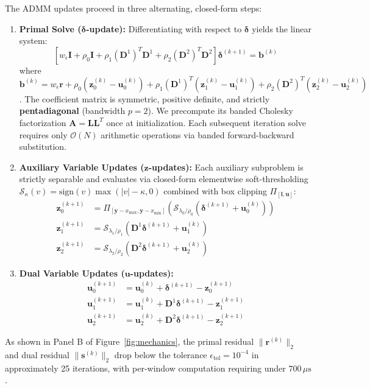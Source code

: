 \documentclass[11pt,a4paper]{article}
\begin{document}
The ADMM updates proceed in three alternating, closed-form steps:
\begin{enumerate}
    \item \textbf{Primal Solve ($\boldsymbol{\delta}$-update):} Differentiating with respect to $\boldsymbol{\delta}$ yields the linear system:
    \begin{equation}
    \left[ w_\epsilon \mathbf{I} + \rho_0 \mathbf{I} + \rho_1 (\mathbf{D}^1)^T \mathbf{D}^1 + \rho_2 (\mathbf{D}^2)^T \mathbf{D}^2 \right] \boldsymbol{\delta}^{(k+1)} = \mathbf{b}^{(k)}
    \end{equation}
    where $\mathbf{b}^{(k)} = w_\epsilon \mathbf{r} + \rho_0(\mathbf{z}_0^{(k)} - \mathbf{u}_0^{(k)}) + \rho_1 (\mathbf{D}^1)^T(\mathbf{z}_1^{(k)} - \mathbf{u}_1^{(k)}) + \rho_2 (\mathbf{D}^2)^T(\mathbf{z}_2^{(k)} - \mathbf{u}_2^{(k)})$.
    The coefficient matrix is symmetric, positive definite, and strictly \textbf{pentadiagonal} (bandwidth $p = 2$). We precompute its banded Cholesky factorization $\mathbf{A} = \mathbf{L} \mathbf{L}^T$ once at initialization. Each subsequent iteration solve requires only $\mathcal{O}(N)$ arithmetic operations via banded forward-backward substitution.
    
    \item \textbf{Auxiliary Variable Updates ($\mathbf{z}$-updates):} Each auxiliary subproblem is strictly separable and evaluates via closed-form elementwise soft-thresholding $\mathcal{S}_\kappa(v) = \text{sign}(v) \max(|v| - \kappa, 0)$ combined with box clipping $\Pi_{[\mathbf{l}, \mathbf{u}]}$:
    \begin{align}
    \mathbf{z}_0^{(k+1)} &= \Pi_{[\mathbf{y} - x_{\max}, \mathbf{y} - x_{\min}]} \left( \mathcal{S}_{\lambda_0 / \rho_0}\left(\boldsymbol{\delta}^{(k+1)} + \mathbf{u}_0^{(k)}\right) \right) \\
    \mathbf{z}_1^{(k+1)} &= \mathcal{S}_{\lambda_1 / \rho_1}\left(\mathbf{D}^1 \boldsymbol{\delta}^{(k+1)} + \mathbf{u}_1^{(k)}\right) \\
    \mathbf{z}_2^{(k+1)} &= \mathcal{S}_{\lambda_2 / \rho_2}\left(\mathbf{D}^2 \boldsymbol{\delta}^{(k+1)} + \mathbf{u}_2^{(k)}\right)
    \end{align}

    \item \textbf{Dual Variable Updates ($\mathbf{u}$-updates):}
    \begin{align}
    \mathbf{u}_0^{(k+1)} &= \mathbf{u}_0^{(k)} + \boldsymbol{\delta}^{(k+1)} - \mathbf{z}_0^{(k+1)} \\
    \mathbf{u}_1^{(k+1)} &= \mathbf{u}_1^{(k)} + \mathbf{D}^1 \boldsymbol{\delta}^{(k+1)} - \mathbf{z}_1^{(k+1)} \\
    \mathbf{u}_2^{(k+1)} &= \mathbf{u}_2^{(k)} + \mathbf{D}^2 \boldsymbol{\delta}^{(k+1)} - \mathbf{z}_2^{(k+1)}
    \end{align}
\end{enumerate}
As shown in Panel B of Figure~\ref{fig:mechanics}, the primal residual $\|\mathbf{r}^{(k)}\|_2$ and dual residual $\|\mathbf{s}^{(k)}\|_2$ drop below the tolerance $\epsilon_{\text{tol}} = 10^{-4}$ in approximately 25 iterations, with per-window computation requiring under $700\,\mu\text{s}$.
\end{document}
